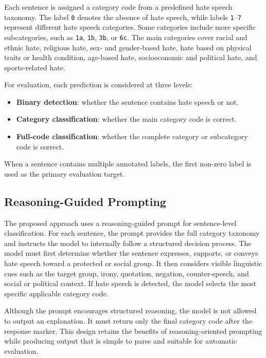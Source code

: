 \documentclass[a4paper]{article}
\begin{document}
Each sentence is assigned a category code from a predefined hate speech taxonomy. The label \texttt{0} denotes the absence of hate speech, while labels \texttt{1}--\texttt{7} represent different hate speech categories. Some categories include more specific subcategories, such as \texttt{1a}, \texttt{1b}, \texttt{3b}, or \texttt{6c}. The main categories cover racial and ethnic hate, religious hate, sex- and gender-based hate, hate based on physical traits or health condition, age-based hate, socioeconomic and political hate, and sports-related hate.

For evaluation, each prediction is considered at three levels:

\begin{itemize}
    \item \textbf{Binary detection}: whether the sentence contains hate speech or not.
    \item \textbf{Category classification}: whether the main category code is correct.
    \item \textbf{Full-code classification}: whether the complete category or subcategory code is correct.
\end{itemize}

When a sentence contains multiple annotated labels, the first non-zero label is used as the primary evaluation target.

\subsection{Reasoning-Guided Prompting}

The proposed approach uses a reasoning-guided prompt for sentence-level classification. For each sentence, the prompt provides the full category taxonomy and instructs the model to internally follow a structured decision process. The model must first determine whether the sentence expresses, supports, or conveys hate speech toward a protected or social group. It then considers visible linguistic cues such as the target group, irony, quotation, negation, counter-speech, and social or political context. If hate speech is detected, the model selects the most specific applicable category code.

Although the prompt encourages structured reasoning, the model is not allowed to output an explanation. It must return only the final category code after the response marker. This design retains the benefits of reasoning-oriented prompting while producing output that is simple to parse and suitable for automatic evaluation.
\end{document}

